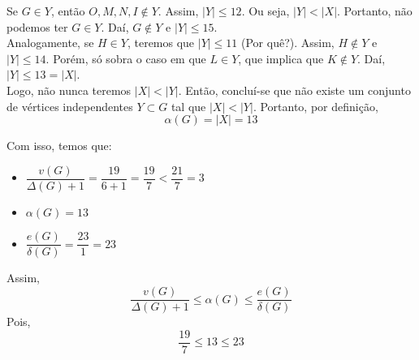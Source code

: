 \documentclass[12pt, a4paper]{article}
\begin{document}
Se \(G \in Y\), então \(O, M, N, I \notin Y\). Assim, \(|Y| \leq 12\). Ou seja, \(|Y| < |X|\). Portanto, não podemos ter \(G \in Y\). Daí, \(G \notin Y\) e \(|Y| \leq 15\). \\

Analogamente, se \(H \in Y\), teremos que \(|Y| \leq 11\) (Por quê?). Assim, \(H \notin Y\) e \(|Y| \leq 14\). Porém, só sobra o caso em que \(L \in Y\), que implica que \(K \notin Y\). Daí, \(|Y| \leq 13 = |X|\). \\

Logo, não nunca teremos \(|X| < |Y|\). Então, concluí-se que não existe um conjunto de vértices independentes \(Y \subset G\) tal que \(|X| < |Y|\). Portanto, por definição, \[\alpha(G) = |X| = 13\]  
 
Com isso, temos que:

\begin{itemize}
\item \(\dfrac{v(G)}{\Delta(G)+1}= \dfrac{19}{6+1}=\dfrac{19}{7} < \dfrac{21}{7} = 3\)

\item \(\alpha(G)=13\)

\item \(\dfrac{e(G)}{\delta(G)}=\dfrac{23}{1}=23\)
\end{itemize}

Assim, \[\dfrac{v(G)}{\Delta(G) + 1} \leq \alpha(G) \leq \dfrac{e(G)}{\delta(G)}\] Pois, 
\[\dfrac{19}{7} \leq 13 \leq 23\]
\end{document}
